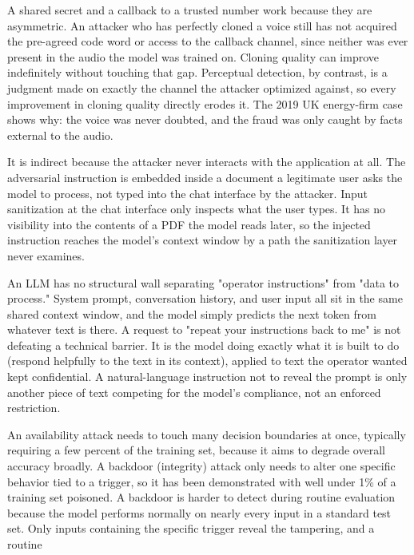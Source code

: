 \begin{answerkey}
\item A shared secret and a callback to a trusted number work because they are asymmetric. An
attacker who has perfectly cloned a voice still has not acquired the pre-agreed code word or access
to the callback channel, since neither was ever present in the audio the model was trained on.
Cloning quality can improve indefinitely without touching that gap. Perceptual detection, by
contrast, is a judgment made on exactly the channel the attacker optimized against, so every
improvement in cloning quality directly erodes it. The 2019 UK energy-firm case shows why: the
voice was never doubted, and the fraud was only caught by facts external to the audio.
\item It is indirect because the attacker never interacts with the application at all. The
adversarial instruction is embedded inside a document a legitimate user asks the model to process,
not typed into the chat interface by the attacker. Input sanitization at the chat interface only
inspects what the user types. It has no visibility into the contents of a PDF the model reads
later, so the injected instruction reaches the model's context window by a path the sanitization
layer never examines.
\item An LLM has no structural wall separating "operator instructions" from "data to process."
System prompt, conversation history, and user input all sit in the same shared context window, and
the model simply predicts the next token from whatever text is there. A request to "repeat your
instructions back to me" is not defeating a technical barrier. It is the model doing exactly what
it is built to do (respond helpfully to the text in its context), applied to text the operator
wanted kept confidential. A natural-language instruction not to reveal the prompt is only another
piece of text competing for the model's compliance, not an enforced restriction.
\item An availability attack needs to touch many decision boundaries at once, typically requiring a
few percent of the training set, because it aims to degrade overall accuracy broadly. A backdoor
(integrity) attack only needs to alter one specific behavior tied to a trigger, so it has been
demonstrated with well under 1\% of a training set poisoned. A backdoor is harder to detect during
routine evaluation because the model performs normally on nearly every input in a standard
test set. Only inputs containing the specific trigger reveal the tampering, and a routine

\end{answerkey}
